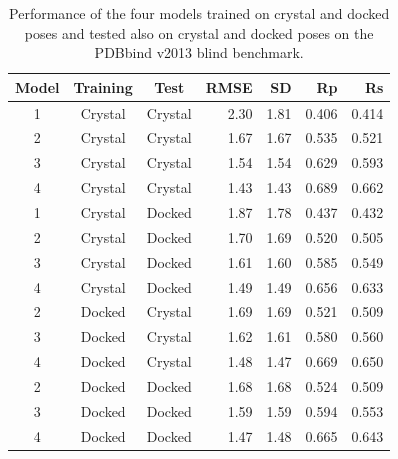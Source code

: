 \begin{table}
\caption{Performance of the four models trained on crystal and docked poses and tested also on crystal and docked poses on the PDBbind v2013 blind benchmark.}
\label{rfscore4:tbl-set-2-pdbbind-2012}
\begin{tabular}{cccrrrr}
\hline
Model & Training & Test & RMSE & SD & Rp & Rs\\
\hline
1 & Crystal & Crystal & 2.30 & 1.81 & 0.406 & 0.414\\
2 & Crystal & Crystal & 1.67 & 1.67 & 0.535 & 0.521\\
3 & Crystal & Crystal & 1.54 & 1.54 & 0.629 & 0.593\\
4 & Crystal & Crystal & 1.43 & 1.43 & 0.689 & 0.662\\
\hline
1 & Crystal & Docked  & 1.87 & 1.78 & 0.437 & 0.432\\
2 & Crystal & Docked  & 1.70 & 1.69 & 0.520 & 0.505\\
3 & Crystal & Docked  & 1.61 & 1.60 & 0.585 & 0.549\\
4 & Crystal & Docked  & 1.49 & 1.49 & 0.656 & 0.633\\
\hline
2 & Docked  & Crystal & 1.69 & 1.69 & 0.521 & 0.509\\
3 & Docked  & Crystal & 1.62 & 1.61 & 0.580 & 0.560\\
4 & Docked  & Crystal & 1.48 & 1.47 & 0.669 & 0.650\\
\hline
2 & Docked  & Docked  & 1.68 & 1.68 & 0.524 & 0.509\\
3 & Docked  & Docked  & 1.59 & 1.59 & 0.594 & 0.553\\
4 & Docked  & Docked  & 1.47 & 1.48 & 0.665 & 0.643\\
\hline
\end{tabular}
\end{table}

